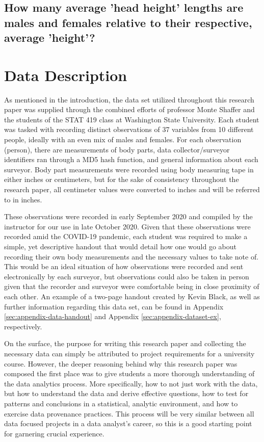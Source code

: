 \documentclass[]{article}
\begin{document}
\subsection{How many average 'head height' lengths are males and females relative to their respective, average 'height'?}
\label{sec:rq4}

\section{Data Description}
\label{sec:data}

As mentioned in the introduction, the data set utilized throughout this
research paper was supplied through the combined efforts of professor
Monte Shaffer and the students of the STAT 419 class at Washington State
University. Each student was tasked with recording distinct observations
of 37 variables from 10 different people, ideally with an even mix of
males and females. For each observation (person), there are measurements
of body parts, data collector/surveyor identifiers ran through a MD5
hash function, and general information about each surveyor. Body part
measurements were recorded using body measuring tape in either inches or
centimeters, but for the sake of consistency throughout the research
paper, all centimeter values were converted to inches and will be
referred to in inches.

\vspace{0.25cm}

These observations were recorded in early September 2020 and compiled by
the instructor for our use in late October 2020. Given that these
observations were recorded amid the COVID-19 pandemic, each student was
required to make a simple, yet descriptive handout that would detail how
one would go about recording their own body measurements and the
necessary values to take note of. This would be an ideal situation of
how observations were recorded and sent electronically by each surveyor,
but observations could also be taken in person given that the recorder
and surveyor were comfortable being in close proximity of each other. An
example of a two-page handout created by Kevin Black, as well as further
information regarding this data set, can be found in Appendix
\ref{sec:appendix-data-handout} and Appendix
\ref{sec:appendix-dataset-ex}, respectively.

\vspace{0.25cm}

On the surface, the purpose for writing this research paper and
collecting the necessary data can simply be attributed to project
requirements for a university course. However, the deeper reasoning
behind why this research paper was composed the first place was to give
students a more thorough understanding of the data analytics process.
More specifically, how to not just work with the data, but how to
understand the data and derive effective questions, how to test for
patterns and conclusions in a statistical, analytic environment, and how
to exercise data provenance practices. This process will be very similar
between all data focused projects in a data analyst's career, so this is
a good starting point for garnering crucial experience.
\end{document}

